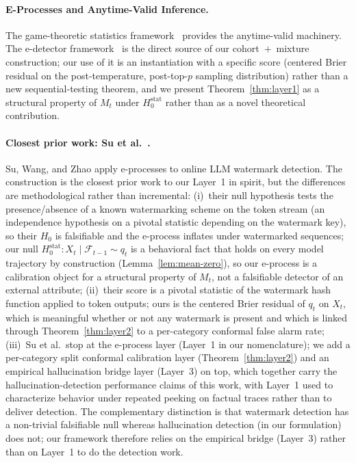 \documentclass[runningheads]{llncs}
\newcommand{\Hnull}{H_0^{\text{stat}}}
\begin{document}
\paragraph{E-Processes and Anytime-Valid Inference.}
The game-theoretic statistics framework~\cite{ramdas2023gametheoretic,
howard2021timeuniform,waudbysmith2024estimating} provides the anytime-valid
machinery. The e-detector framework~\cite{shin2023edetectors} is the direct
source of our cohort~$+$~mixture construction; our use of it is an
instantiation with a specific score (centered Brier residual on the
post-temperature, post-top-$p$ sampling distribution) rather than a new
sequential-testing theorem, and we present Theorem~\ref{thm:layer1} as a
structural property of $M_t$ under $\Hnull$ rather than as a novel
theoretical contribution.

\paragraph{Closest prior work: Su et al.~\cite{su2026online}.}
Su, Wang, and Zhao apply e-processes to online LLM watermark detection.
The construction is the closest prior work to our Layer~1 in spirit, but
the differences are methodological rather than incremental: (i)~their null
hypothesis tests the presence/absence of a known watermarking scheme on
the token stream (an independence hypothesis on a pivotal statistic
depending on the watermark key), so their $H_0$ is falsifiable and the
e-process inflates under watermarked sequences; our null
$\Hnull: X_t \mid \mathcal{F}_{t-1} \sim q_t$ is a behavioral fact that
holds on every model trajectory by construction (Lemma~\ref{lem:mean-zero}),
so our e-process is a calibration object for a structural property of
$M_t$, not a falsifiable detector of an external attribute; (ii)~their
score is a pivotal statistic of the watermark hash function applied to
token outputs; ours is the centered Brier residual of $q_t$ on $X_t$,
which is meaningful whether or not any watermark is present and which is
linked through Theorem~\ref{thm:layer2} to a per-category conformal false
alarm rate; (iii)~Su et al.\ stop at the e-process layer (Layer~1 in our
nomenclature); we add a per-category split conformal calibration layer
(Theorem~\ref{thm:layer2}) and an empirical hallucination bridge layer
(Layer~3) on top, which together carry the hallucination-detection
performance claims of this work, with Layer~1 used to characterize
behavior under repeated peeking on factual traces rather than to deliver
detection. The complementary distinction is that watermark detection has
a non-trivial falsifiable null whereas hallucination detection (in our
formulation) does not; our framework therefore relies on the empirical
bridge (Layer~3) rather than on Layer~1 to do the detection work.
\end{document}
